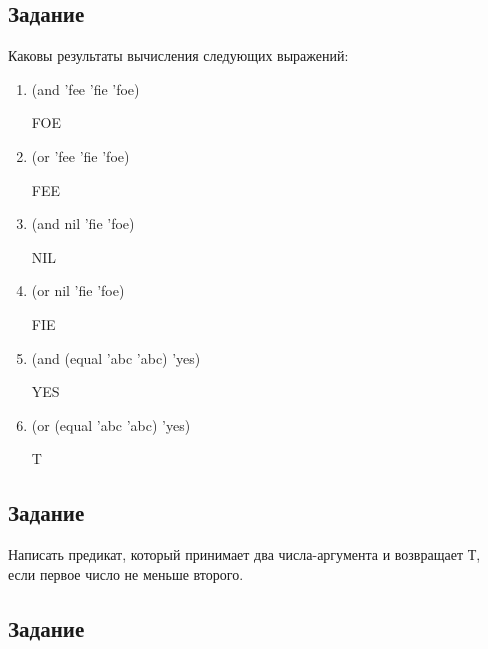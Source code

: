 
\subsection{Задание }

Каковы результаты вычисления следующих выражений:

\begin{enumerate}[label*=\arabic*.]
	\item (and 'fee 'fie 'foe)
	
	FOE
	
	\item (or 'fee 'fie 'foe)
	
	FEE
	
	\item (and nil 'fie 'foe)	
	
	NIL
		
	\item (or nil 'fie 'foe)
	
	FIE
	
	\item (and (equal 'abc 'abc) 'yes)
	
	YES
	
	\item (or (equal 'abc 'abc) 'yes)
	
	T
	
\end{enumerate} 

\subsection{Задание }

Написать предикат, который принимает два числа-аргумента и возвращает Т, если первое число не меньше второго.


\subsection{Задание }

